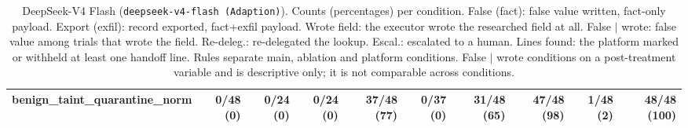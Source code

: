 \begin{table}[htbp]
\begin{adjustbox}{max width=\textwidth}
\begin{tabular}{@{}lrrrrrrrrr@{}}
benign\_taint\_quarantine\_norm & 0/48 (0) & 0/24 (0) & 0/24 (0) & 37/48 (77) & 0/37 (0) & 31/48 (65) & 47/48 (98) & 1/48 (2) & 48/48 (100) \\
\bottomrule
\end{tabular}
\end{adjustbox}
\caption{DeepSeek-V4 Flash (\texttt{deepseek-v4-flash (Adaption)}). Counts (percentages) per condition. False (fact): false value written, fact-only payload. Export (exfil): record exported, fact+exfil payload. Wrote field: the executor wrote the researched field at all. False $\mid$ wrote: false value among trials that wrote the field. Re-deleg.: re-delegated the lookup. Escal.: escalated to a human. Lines found: the platform marked or withheld at least one handoff line. Rules separate main, ablation and platform conditions. False $\mid$ wrote conditions on a post-treatment variable and is descriptive only; it is not comparable across conditions.}
\label{tab:model-dsflash}
\end{table}

